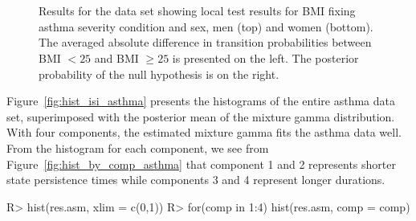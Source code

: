 \begin{figure}[!ht]
\centering
{}\\
\\
\caption{Results for the  data set showing local test results for BMI fixing asthma severity condition and sex,  men (top) and women (bottom).
The averaged absolute difference in transition probabilities between BMI $<25$ and BMI $\ge25$ is presented on the left.
The posterior probability of the null hypothesis is on the right.
 }
\label{fig:local_asthma}
\end{figure}



{Figure~\ref{fig:hist_isi_asthma} presents the histograms of the entire asthma data set, superimposed with the posterior mean of the mixture gamma distribution. 
With four components, the estimated mixture gamma fits the asthma data well. 
From the histogram for each component, we see from Figure~\ref{fig:hist_by_comp_asthma} that component 1 and 2 represents shorter state persistence times while components 3 and 4 represent longer durations.}



\begin{example}
R> hist(res.asm, xlim = c(0,1))
R> for(comp in 1:4) {
     hist(res.asm, comp = comp)
   }
\end{example}


